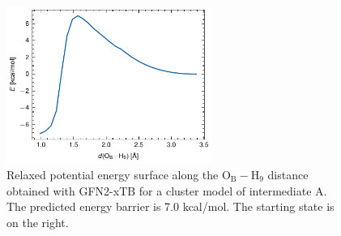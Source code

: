 \begin{figure}[htbp]
    \centering
    \includegraphics[width=0.6\textwidth]{Figures/xtb_cluster.pdf}
    \caption{Relaxed potential energy surface along the O$_{\text{B}}-$H$_9$ distance obtained with GFN2-xTB for a cluster model of intermediate A. The predicted energy barrier is 7.0 kcal/mol. The starting state is on the right.}
    \label{fig:xtb_cluster}
\end{figure}


